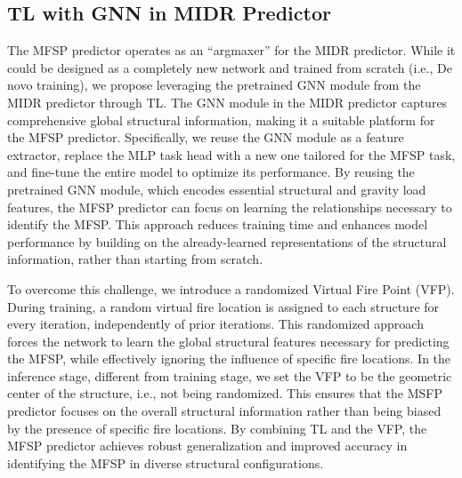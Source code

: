 \subsection{TL with GNN in MIDR Predictor}
\label{subsec:mfspp_transfer_learning}
The MFSP predictor operates as an ``argmaxer'' for the MIDR predictor. While it could be designed as a completely new network and trained from scratch (i.e., De novo training), we propose leveraging the pretrained GNN module from the MIDR predictor through TL. The GNN module in the MIDR predictor captures comprehensive global structural information, making it a suitable platform for the MFSP predictor. Specifically, we reuse the GNN module as a feature extractor, replace the MLP task head with a new one tailored for the MFSP task, and fine-tune the entire model to optimize its performance.
By reusing the pretrained GNN module, which encodes essential structural and gravity load features, the MFSP predictor can focus on learning the relationships necessary to identify the MFSP. This approach reduces training time and enhances model performance by building on the already-learned representations of the structural information, rather than starting from scratch.

 To overcome this challenge, we introduce a randomized Virtual Fire Point (VFP).  During training, a random virtual fire location is assigned to each structure for every iteration, independently of prior iterations. This randomized approach forces the network to learn the global structural features necessary for predicting the MFSP, while effectively ignoring the influence of specific fire locations. 
In the inference stage, different from training stage, we set the VFP to be the geometric center of the structure, i.e., not being randomized. This ensures that the MSFP predictor focuses on the overall structural information rather than being biased by the presence of specific fire locations. By combining TL and the VFP, the MFSP predictor achieves robust generalization and improved accuracy in identifying the MFSP in diverse structural configurations.
